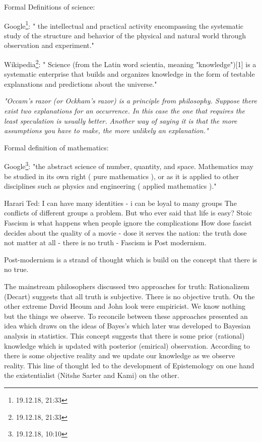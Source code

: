 \documentclass[14pt,oneside]{amsart}
\begin{document}
\bigskip


Formal Definitions of science:

\bigskip

Google\footnote{19.12.18, 21:33}: " the intellectual and practical activity encompassing the systematic study of the structure and behavior of the physical and natural world through observation and experiment."

\bigskip

Wikipedia\footnote{19.12.18, 21:33}: " Science (from the Latin word scientia, meaning "knowledge")[1] is a systematic enterprise that builds and organizes knowledge in the form of testable explanations and predictions about the universe."

\bigskip

\textit{"Occam's razor (or Ockham's razor) is a principle from philosophy. Suppose there exist two explanations for an occurrence. In this case the one that requires the least speculation is usually better. Another way of saying it is that the more assumptions you have to make, the more unlikely an explanation."}

\bigskip

Formal definition of mathematics:

Google\footnote{19.12.18, 10:10}: "the abstract science of number, quantity, and space. Mathematics may be studied in its own right ( pure mathematics ), or as it is applied to other disciplines such as physics and engineering ( applied mathematics )."

\bigskip

Harari Ted:
I can have many identities - i can be loyal to many groups
The conflicts of different groups a problem.
But who ever said that life is easy? Stoic
Fascism is what happens when people ignore the complications
How dose fascist decides about the quality of a movie - dose it serves the nation: the truth dose not matter at all - there is no truth - Fascism is Post modernism.

Post-modernism is a strand of thought which is build on the concept that there is no true. 

The mainstream philosophers discussed two approaches for truth: Rationalizem (Decart) suggests that all truth is subjective. There is no objective truth. On the other extreme David Heoum and John look were empiricist. We know nothing but the things we observe. To reconcile between these approaches \cite{kant} presented an idea which draws on the ideas of Bayes's which later was developed to Bayesian analysis in statistics. This concept suggests that there is some prior (rational) knowledge which is updated with posterior (emirical) observation. According to \cite{Kant} there is some objective reality and we update our knowledge as we observe reality. This line of thought led to the development of Epistemology on one hand the existentialist (Nitshe Sarter and Kami) on the other.
\end{document}
